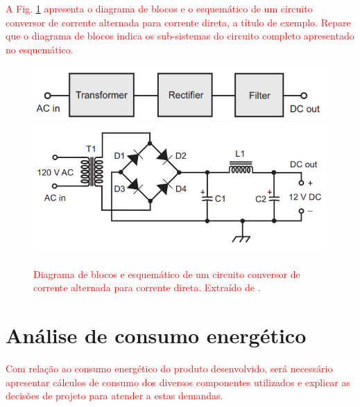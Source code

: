 \textcolor{red}{A Fig. \ref{fig:diagrama_blocos_e_esquematico} apresenta o diagrama de blocos e o esquemático de um circuito conversor de corrente alternada para corrente direta, a título de exemplo. Repare que o diagrama de blocos indica os sub-sistemas do circuito completo apresentado no esquemático. 
}

\begin{figure}
    \centering
    \includegraphics[width=0.5\linewidth]{figuras/Exemplo-diagrama-de-blocos.png}
    \includegraphics[width=0.5\linewidth]{figuras/Esquematico.png}
    \caption{\textcolor{red}{Diagrama de blocos e esquemático de um circuito conversor de corrente alternada para corrente direta. Extraído de \cite{block_n_schematic}.}}
    \label{fig:diagrama_blocos_e_esquematico}
\end{figure}

\section{Análise de consumo energético}

\textcolor{red}{Com relação ao consumo energético do produto desenvolvido, será necessário apresentar cálculos de consumo dos diversos componentes utilizados e explicar as decisões de projeto para atender a estas demandas.}


